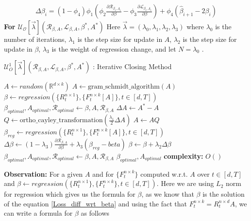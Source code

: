 \begin{equation}
\begin{aligned}
    \Delta \beta_{i} =  (1-\phi_4)\phi_1(\phi_2 \frac{\partial \mathcal{R}_{\beta_i, A_{i}}}{\partial \beta} - \phi_3 \frac{\partial \mathcal{L}_{\beta_i, A_{i}}}{\partial \beta} ) + \phi_4(\hat{\beta}_{i+1}-2\beta_{i})
\end{aligned}
\end{equation}
\hspace{2mm} \newline \textbf{For $\mathcal{U_{O}}[\vec{\lambda}](\mathcal{R}_{\beta, A},\mathcal{L}_{\beta, A},\beta^{*},A^{*})$}
\newline Here $\vec{\lambda} = (\lambda_0,\lambda_1,\lambda_2, \lambda_3)$ where $\lambda_0$ is the number of iterations, $\lambda_1$ is the step size for update in $A$, $\lambda_2$ is the step size for update in $\beta$, $\lambda_3$ is the weight of regression change, and let $N = \lambda_0$ .
\begin{algorithm}[H]
\caption{$\mathcal{U}^{1}_{O}[\vec{\lambda}](\mathcal{R}_{\beta, A},\mathcal{L}_{\beta, A},\beta^{*},A^{*})$ : Iterative Closing Method}\label{lfm_baseline_method}
\begin{algorithmic}[1]
\State $A \gets random(\mathbb{R}^{d\times k})$
\State $A \gets \text{gram\_schmidt\_algorithm}(A)$
\State $\beta \gets regression(\{R^{n\times 1}_{t}\},\{F^{n\times k}_{t}[A]\}, t\in [d,T])$
\State $\beta_{optimal}, A_{optimal}, \mathcal{R}_{optimal} \gets \beta, A, \mathcal{R}_{\beta, A}$
    \State $\Delta A \gets A^{*} - A$
    \State $Q \gets \text{ortho\_cayley\_transformation}(\frac{\lambda_1}{2} \Delta A)$
    \State $A \gets AQ$
    \State $\beta_{reg} \gets regression(\{R^{n\times 1}_{t}\},\{F^{n\times k}_{t}[A]\}, t\in [d,T])$
    \State $\Delta \beta \gets (1-\lambda_3)\frac{\partial \mathcal{R}_{\beta, A}}{\partial \beta} + \lambda_3 (\beta_{reg}-beta)$
    \State $\beta \gets \beta + \lambda_2 \Delta \beta$
      
        \State $\beta_{optimal}, A_{optimal}, \mathcal{R}_{optimal} \gets \beta, A, \mathcal{R}_{\beta, A} $
    \EndIf 
\EndFor
\State \Return  $\beta_{optimal}, A_{optimal}$
\State \textbf{complexity: } $O()$
\end{algorithmic}
\end{algorithm} \newline \textbf{Observation:} For a given $A$ and for $\{F^{n\times k}_{t}\}$ computed w.r.t. $A$ over $t\in [d,T]$ and $\beta \gets regression(\{R^{n\times 1}_{t}\},\{F^{n\times k}_{t}\}, t\in [d,T])$. Here we are using $L_2$ norm for regression which gives us the formula for $\beta$, as we know that $\beta$ is the solution of the equation \ref{Loss_diff_wrt_beta} and using the fact that $F^{n\times k}_{t} = R^{n\times d}_{t}A$, we can write a formula for $\beta$ as follows
